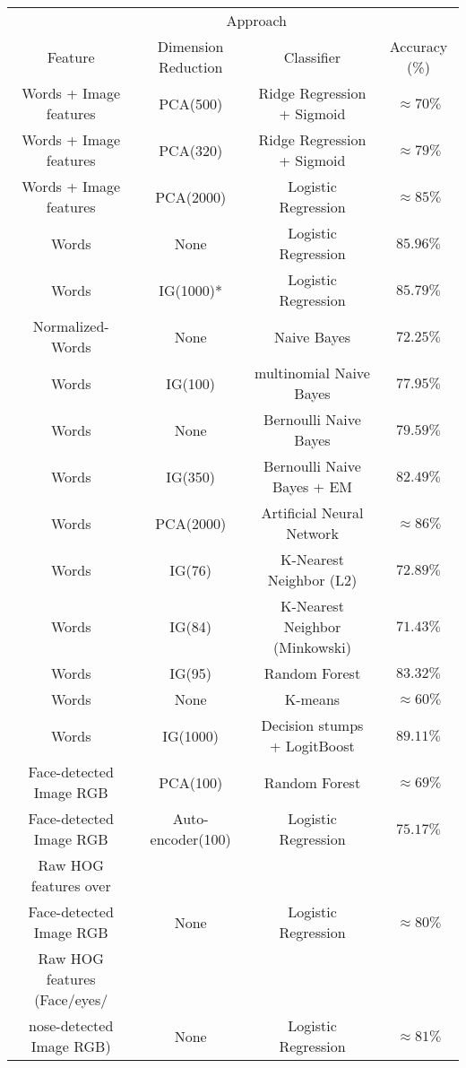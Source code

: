 \begin{table}[h!]
\centering
\begin{tabular*}{\textwidth}{c @{\extracolsep{\fill}}ccc}
\hline
& \multicolumn{2}{c}{Approach}\\
\cline{2-3}
Feature & Dimension Reduction & Classifier & Accuracy (\%) \\
\hline
\hline 
Words + Image features & PCA(500) & Ridge Regression + Sigmoid & $\approx 70\%$\\ \hline
Words + Image features & PCA(320) & Ridge Regression + Sigmoid & $\approx 79\%$ \\ \hline
Words + Image features & PCA(2000) & Logistic Regression & $\approx 85\%$ \\ \hline
Words & None & Logistic Regression & $ 85.96\%$ \\ \hline
Words & IG(1000)* & Logistic Regression & $ 85.79\%$ \\ \hline
Normalized-Words & None & Naive Bayes & $72.25\%$ \\ \hline
Words & IG(100) & multinomial Naive Bayes & $ 77.95\%$ \\ \hline
Words & None & Bernoulli Naive Bayes & $ 79.59\%$ \\ \hline
Words & IG(350) & Bernoulli Naive Bayes + EM & $ 82.49\%$ \\ \hline
Words & PCA(2000) & Artificial Neural Network & $ \approx 86\%$ \\ \hline
Words & IG(76) & K-Nearest Neighbor (L2) & $ 72.89\%$ \\ \hline
Words & IG(84) & K-Nearest Neighbor (Minkowski)  & $ 71.43\%$ \\ \hline
Words & IG(95) & Random Forest & $83.32\%$ \\ \hline
Words & None & K-means & $ \approx 60\%$\\ \hline
Words & IG(1000) & Decision stumps + LogitBoost& $89.11\%$\\ \hline
Face-detected Image RGB & PCA(100) & Random Forest & $\approx 69\%$ \\ \hline
Face-detected Image RGB & Auto-encoder(100) & Logistic Regression & $75.17\%$ \\ \hline
Raw HOG features over &  &  &\\
Face-detected Image RGB & None & Logistic Regression &  $\approx 80\%$  \\  \hline
Raw HOG features (Face/eyes/ & & & \\ 
nose-detected Image RGB) & None & Logistic Regression & $\approx 81\%$ \\ \hline

\end{tabular*}
\end{table}
